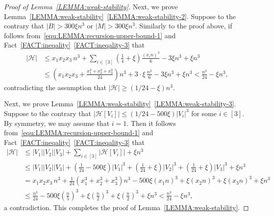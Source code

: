 \documentclass[11pt,a4paper]{article}
\theoremstyle{remark}
\newcommand{\C}[1]{\mathcal{#1}}
\begin{document}
\begin{proof}[Proof of Lemma~\ref{LEMMA:weak-stability}]
Next, we prove Lemma~\ref{LEMMA:weak-stability}~\ref{LEMMA:weak-stability-2}. 
Suppose to the contrary that $|B| >  300 \xi n^{3}$ or $|M| > 300 \xi n^{3}$. 
Similarly to the proof above, if follows from~\eqref{equ:LEMMA:recursion-upper-bound-1} and Fact~\ref{FACT:ineqality}~\ref{FACT:ineqality-3} that 
    \begin{align*}
        |\mathcal{H}|
        & \le x_1 x_2 x_3\, n^3 + \sum_{i\in [3]} \left(\frac{1}{4} + \xi \right) \frac{(x_in)^3}{6} - 3\xi n^3 + \xi n^3 \\
        & \le \left(x_1 x_2 x_3 + \frac{x_1^3 + x_2^3 + x_3^3}{24}\right) n^3 + 3\cdot \xi\, \frac{n^3}{6} - 3\xi n^3 + \xi n^3  
        < \frac{n^3}{24}  - \xi n^3, 
    \end{align*}
    contradicting the assumption that $|\mathcal{H}| \ge (1/24 - \xi)n^3$. 

    Next, we prove Lemma~\ref{LEMMA:weak-stability}~\ref{LEMMA:weak-stability-3}.
    Suppose to the contrary that $|\mathcal{H}[V_i]| \le (1/24 - 500\xi) |V_i|^3$ for some $i \in [3]$. 
    By symmetry, we may assume that $i =1$. 
    Then it follows from~\eqref{equ:LEMMA:recursion-upper-bound-1} and Fact~\ref{FACT:ineqality}~\ref{FACT:ineqality-3} that
        \begin{align*}
            |\mathcal{H}|
            & \le |V_1||V_2||V_3| + \sum_{i\in [3]}|\mathcal{H}[V_i]| +\xi n^3 \\
            & \le |V_1||V_2||V_3|  + \left(\frac{1}{24} - 500\xi \right) |V_1|^3 + \left(\frac{1}{24} +\xi \right) |V_2|^3 + \left(\frac{1}{24} + \xi \right) |V_3|^3 +\xi n^3\\
            & = x_1 x_2 x_3\, n^3 + \frac{1}{24}\left(x_1^3 + x_2^3 + x_3^3\right)n^3 - 500\xi (x_1 n)^3 + \xi(x_2 n)^3 + \xi(x_3 n)^3  + \xi n^3\\
            & \le \frac{n^3}{24} - 500\xi \left(\frac{n}{5}\right)^3 + \xi \left(\frac{n}{2}\right)^3 + \xi \left(\frac{n}{2}\right)^3  + \xi n^3
            < \frac{n^3}{24} - \xi n^3, 
        \end{align*}
        a contradiction. This completes the proof of Lemma~\ref{LEMMA:weak-stability}. 
\end{proof}%
\end{document}
